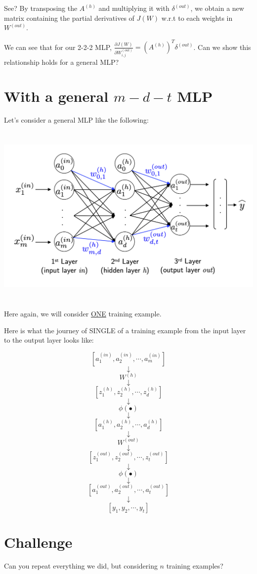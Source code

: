 \documentclass[12pt, letterpaper]{article}
\begin{document}
See? By transposing the $A^{(h)}$ and multiplying it with
$\delta^{(out)}$, we obtain a new matrix containing the partial
derivatives of $J(W)$ w.r.t to each weights in $W^{(out)}$.

\vspace{5mm} %

We can see that for our 2-2-2 MLP, $\frac{\partial J(W)}
{\partial W_{i,j}^{(out)}} = (A^{(h)})^{T} \delta^{(out)}$.
Can we show this relationship holds for a general MLP?

\section{With a general $m-d-t$ MLP}

Let's consider a general MLP like the following:

\begin{center}
    \includegraphics[width = 16cm, height = 9cm]{mlp.png}
\end{center}

Here again, we will consider \underline{ONE} training example.

\vspace{5mm} %

Here is what the journey of SINGLE of a training example from 
the input layer to the output layer looks like:

\pagebreak
\[[a_1^{(in)}, a_2^{(in)}, \cdots, a_m^{(in)}]\]
\[\downarrow\]
\[W^{(h)}\]
\[\downarrow\]                  
\[[z_1^{(h)}, z_2^{(h)}, \cdots, z_d^{(h)}]\]
\[\downarrow\]
\[\phi(\bullet)\]
\[\downarrow\]
\[[a_1^{(h)}, a_2^{(h)}, \cdots, a_d^{(h)}]\]
\[\downarrow\]
\[W^{(out)}\]
\[\downarrow\]                  
\[[z_1^{(out)}, z_2^{(out)}, \cdots, z_t^{(out)}]\]
\[\downarrow\]
\[\phi(\bullet)\]
\[\downarrow\]
\[[a_1^{(out)}, a_2^{(out)}, \cdots, a_t^{(out)}]\]
\[\downarrow\]
\[[y_1, y_2, \cdots, y_t]\]
\pagebreak

\section{Challenge}

Can you repeat everything we did, but considering $n$ training
examples?
\end{document}
